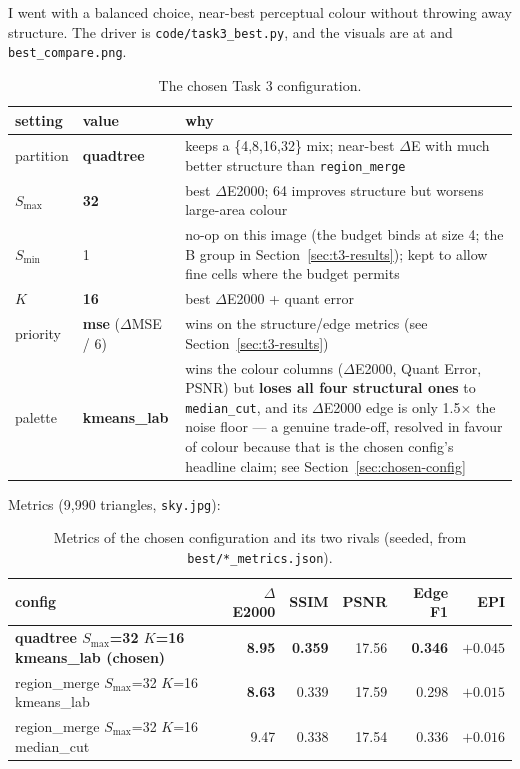 \documentclass[11pt,a4paper]{article}
\begin{document}
I went with a balanced choice, near-best perceptual colour without throwing away
structure. The driver is \texttt{code/task3\_best.py}, and the visuals are at
 and
\texttt{best\_compare.png}.

\begin{table}[htbp]
\centering
\footnotesize
\begin{tabularx}{\textwidth}{@{}l l Y@{}}
\toprule
\textbf{setting} & \textbf{value} & \textbf{why}\\
\midrule
partition & \textbf{quadtree} & keeps a \{4,8,16,32\} mix; near-best $\Delta$E with much better structure than \texttt{region\_merge}\\
$S_{\max}$ & \textbf{32} & best $\Delta$E2000; 64 improves structure but worsens large-area colour\\
$S_{\min}$ & 1 & no-op on this image (the budget binds at size 4; the B group in Section~\ref{sec:t3-results}); kept to allow fine cells where the budget permits\\
$K$ & \textbf{16} & best $\Delta$E2000 + quant error\\
priority & \textbf{mse} ($\Delta$MSE / 6) & wins on the structure/edge metrics (see Section~\ref{sec:t3-results})\\
palette & \textbf{kmeans\_lab} & wins the colour columns ($\Delta$E2000, Quant Error, PSNR) but \textbf{loses all four structural ones} to \texttt{median\_cut}, and its $\Delta$E2000 edge is only 1.5$\times$ the noise floor --- a genuine trade-off, resolved in favour of colour because that is the chosen config's headline claim; see Section~\ref{sec:chosen-config}\\
\bottomrule
\end{tabularx}
\caption{The chosen Task 3 configuration.}
\label{tab:chosenconfig}
\end{table}

Metrics (9{,}990 triangles, \texttt{sky.jpg}):

\begin{table}[htbp]
\centering
\begin{tabular}{@{}p{6.4cm} r r r r r@{}}
\toprule
\textbf{config} & \textbf{$\Delta$E2000} & \textbf{SSIM} & \textbf{PSNR} & \textbf{Edge F1} & \textbf{EPI}\\
\midrule
\textbf{quadtree $S_{\max}$=32 $K$=16 kmeans\_lab (chosen)} & \textbf{8.95} & \textbf{0.359} & 17.56 & \textbf{0.346} & \textbf{$+0.045$} \\
region\_merge $S_{\max}$=32 $K$=16 kmeans\_lab            & \textbf{8.63} & 0.339 & 17.59 & 0.298 & $+0.015$ \\
region\_merge $S_{\max}$=32 $K$=16 median\_cut             & 9.47 & 0.338 & 17.54 & 0.336 & $+0.016$ \\
\bottomrule
\end{tabular}
\caption{Metrics of the chosen configuration and its two rivals (seeded, from
\texttt{best/*\_metrics.json}).}
\label{tab:chosen}
\end{table}
\end{document}
